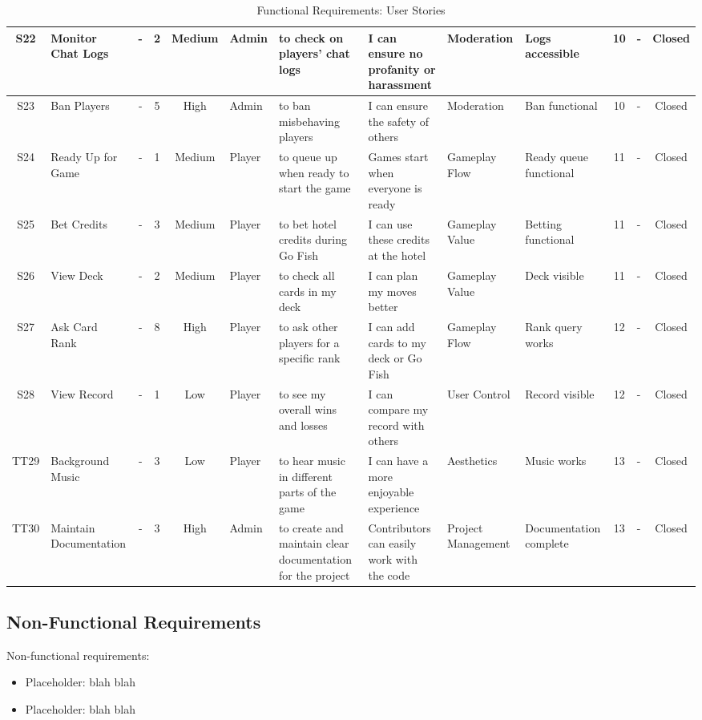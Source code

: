 \documentclass[12pt]{article}
\begin{document}
\begin{table}[H]
{\begin{tabular}{|c|p{2.5cm}|c|c|c|p{3cm}|p{3cm}|p{3cm}|p{3cm}|p{2.5cm}|c|p{2.5cm}|c|}
S22 & Monitor Chat Logs & - & 2 & Medium & Admin & to check on players' chat logs & I can ensure no profanity or harassment & Moderation & Logs accessible & 10 & - & Closed \\ \hline
S23 & Ban Players & - & 5 & High & Admin & to ban misbehaving players & I can ensure the safety of others & Moderation & Ban functional & 10 & - & Closed \\ \hline
S24 & Ready Up for Game & - & 1 & Medium & Player & to queue up when ready to start the game & Games start when everyone is ready & Gameplay Flow & Ready queue functional & 11 & - & Closed \\ \hline
S25 & Bet Credits & - & 3 & Medium & Player & to bet hotel credits during Go Fish & I can use these credits at the hotel & Gameplay Value & Betting functional & 11 & - & Closed \\ \hline
S26 & View Deck & - & 2 & Medium & Player & to check all cards in my deck & I can plan my moves better & Gameplay Value & Deck visible & 11 & - & Closed \\ \hline
S27 & Ask Card Rank & - & 8 & High & Player & to ask other players for a specific rank & I can add cards to my deck or Go Fish & Gameplay Flow & Rank query works & 12 & - & Closed \\ \hline
S28 & View Record & - & 1 & Low & Player & to see my overall wins and losses & I can compare my record with others & User Control & Record visible & 12 & - & Closed \\ \hline
TT29 & Background Music & - & 3 & Low & Player & to hear music in different parts of the game & I can have a more enjoyable experience & Aesthetics & Music works & 13 & - & Closed \\ \hline
TT30 & Maintain Documentation & - & 3 & High & Admin & to create and maintain clear documentation for the project & Contributors can easily work with the code & Project Management & Documentation complete & 13 & - & Closed \\ \hline
\end{tabular}
}
\caption{Functional Requirements: User Stories}
\label{tab:functional_user_stories}
\end{table}

\subsection{Non-Functional Requirements}
Non-functional requirements:
\begin{itemize}
    \item Placeholder: blah blah
    \item Placeholder: blah blah
\end{itemize}
\end{document}
